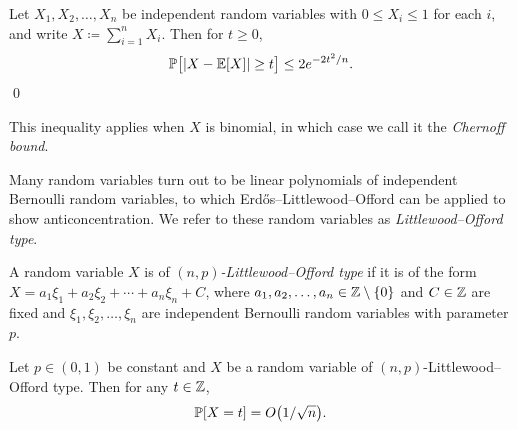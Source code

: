 \begin{proposition}
  \label{prop:azuma-hoeffding}
  
  Let $X_1, X_2, \ldots, X_n$ be independent random variables with $0 \leq X_i \leq 1$ for each $i$, and write $X \coloneqq \sum_{i = 1}^n X_i$. Then for $t \geq 0$, 
  \[
    \mathbb{P}\bigl[|X - \mathbb{E}[X]| \geq t\bigr] \leq 2e^{-2t^2/n}.
  \]
  \qed
\end{proposition}

This inequality applies when $X$ is binomial, in which case we call it the \textit{Chernoff bound}.

Many random variables turn out to be linear polynomials of independent Bernoulli random variables, to which Erd\H{o}s--Littlewood--Offord can be applied to show anticoncentration. We refer to these random variables as \textit{Littlewood--Offord type}.

\begin{definition}
  \label{def:littlewood-offord-type}
  A random variable $X$ is of \textit{$(n, p)$-Littlewood--Offord type} if it is of the form $X = a_1 \xi_1 + a_2 \xi_2 + \cdots + a_n \xi_n + C$, where $a_1, a_2, \ldots, a_n \in \mathbb{Z} \setminus \{0\}$ and $C \in \mathbb{Z}$ are fixed and $\xi_1, \xi_2, \ldots, \xi_n$ are independent Bernoulli random variables with parameter $p$.
\end{definition}

\begin{proposition}
  \label{prop:littlewood-offord}
  Let $p \in (0, 1)$ be constant and $X$ be a random variable of $(n, p)$-Littlewood--Offord type. Then for any $t \in \mathbb{Z}$, 
  \[
    \mathbb{P}[X = t] = O\bigl(1/\sqrt{n}\bigr).
  \]
\end{proposition}

